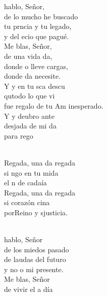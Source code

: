 \documentclass[12pt]{article}
\begin{document}
\begin{multicols*}{2}
\begin{cancion}[Regalada][Ixcís]%
	 hablo, Señor,\\
	de lo mucho he buscado\\
	tu prncia y tu legado,\\
	y del ecio que pagué.\\
	Me blas, Señor,\\
	de una vida da,\\
	donde o lleve cargas,	\\
	donde da necesite.\\
	Y y en tu sca descu\\
	qutodo lo que vi \\
	fue regalo de tu Am inesperado.\\
	Y y deubro ante\\
	desjada de mi da\\
	para  rego\\\jump\\
	\begin{chorus}%
	Regada, una da regada\\
	si ngo en tu mida \\
	el n de cadaía\\
	Regada, una da regada\\
	si  corazón cina \\
	porReino y sjusticia.\\
	\end{chorus}%
	\jump\\
	 hablo, Señor\\
	de los miedos pasado\\
	de laudas del futuro\\
	y no o mi presente.\\
	Me blas, Señor\\
	de vivir el  a día\\

\end{cancion}
\end{multicols*}
\end{document}
